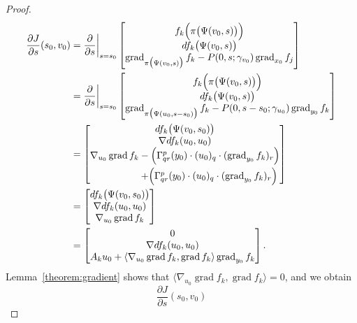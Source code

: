 \documentclass[a4paper,11pt,reqno]{amsart}
\numberwithin{equation}{section}
\theoremstyle{definition}
\theoremstyle{remark}
\begin{document}
\begin{proof}
\begin{align*}
  \frac{\partial J}{\partial s}(s_0,v_0)
& =
  \frac{\partial}{\partial s}\bigg\vert_{s=s_0}
  \begin{bmatrix}
  f_k\Bigl(\pi\bigl(\Psi(v_0,s)\bigr)\Bigr)
  \\
  df_k\bigl(\Psi(v_0,s)\bigr) 
  \\
  \operatorname{grad}_{\pi\bigl(\Psi(v_0,s)\bigr)}f_k
  -
  P(0,s;\gamma_{v_0})\operatorname{grad}_{x_0}f_j
  \end{bmatrix} 
\\
& =
  \frac{\partial}{\partial s}\bigg\vert_{s=s_0}
  \begin{bmatrix}
  f_k\Bigl(\pi\bigl(\Psi(v_0,s)\bigr)\Bigr)
  \\
  df_k\bigl(\Psi(v_0,s)\bigr) 
  \\
  \operatorname{grad}_{\pi\bigl(\Psi(u_0,s-s_0)\bigr)}f_k
  -
  P(0,s-s_0;\gamma_{u_0})\operatorname{grad}_{y_0}f_k
  \end{bmatrix} 
\\
& =
  \begin{bmatrix}
  df_k\bigl(\Psi(v_0,s_0)\bigr)
  \\
  {\nabla}df_k(u_0,u_0) 
  \\
  \nabla_{u_0}\operatorname{grad}f_k
  -
  \Bigl(\Gamma^p_{qr}(y_0)\cdot(u_0)_q\cdot(\operatorname{grad}_{y_0}f_k)_r\Bigr)
\vspace{3pt}
  \\
  \qquad\qquad\quad
  +
  \Bigl(\Gamma^p_{qr}(y_0)\cdot(u_0)_q\cdot(\operatorname{grad}_{y_0}f_k)_r\Bigr)
  \end{bmatrix}
\\
& =
  \begin{bmatrix}
  df_k\bigl(\Psi(v_0,s_0)\bigr)
  \\
  {\nabla}df_k(u_0,u_0) 
  \\
  \nabla_{u_0}\operatorname{grad}f_k
  \end{bmatrix}
\\
& =
  \begin{bmatrix}
  0
  \\
  {\nabla}df_k(u_0,u_0) 
  \\
  A_ku_0+\langle\nabla_{u_0}\operatorname{grad}f_k,\operatorname{grad}f_k\rangle\operatorname{grad}_{y_0}f_k 
  \end{bmatrix}. 
\end{align*}
%
%
Lemma~\ref{theorem:gradient} shows that 
$\langle\nabla_{u_0}\operatorname{grad}f_k,\operatorname{grad}f_k\rangle=0$, and we obtain 
%
%
\begin{equation}
\frac{\partial J}{\partial s}(s_0,v_0) 

\end{equation}
\end{proof}
\end{document}
